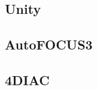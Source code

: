 \subsection{Unity}\label{sec:simulators:unity}

\clearpage
\clearpage
\subsection{AutoFOCUS3}\label{sec:simulators:autofocus3}


\clearpage
\subsection{4DIAC}\label{sec:simulators:4diac}
